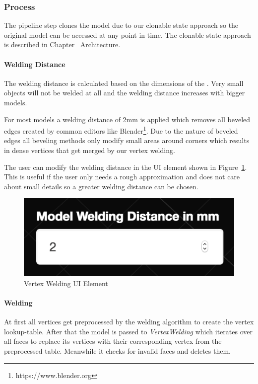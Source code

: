 \documentclass[../ClassicThesis.tex]{subfiles}
\begin{document}
\subsubsection{Process}

The pipeline step clones the model due to our clonable state approach so the original model can be accessed at any point in time. The clonable state approach is described in Chapter~ Architecture.


\paragraph{Welding Distance}

The welding distance is calculated based on the dimensions of the {\threedmodel}. Very small objects will not be welded at all and the welding distance increases with bigger models.

For most models a welding distance of 2mm is applied which removes all beveled edges created by common editors like Blender\footnote{https://www.blender.org}. Due to the nature of beveled edges all beveling methods only modify small areas around corners which results in dense vertices that get merged by our vertex welding.

The user can modify the welding distance in the UI element shown in Figure~\ref{fig:weldingUI}. This is useful if the user only needs a rough approximation and does not care about small details so a greater welding distance can be chosen.

\begin{figure}
\includegraphics[width=0.5\columnwidth]{Images/04-approx-weldingUI.png}
\caption{Vertex Welding UI Element}
\label{fig:weldingUI}
\end{figure}



\paragraph{Welding}

At first all vertices get preprocessed by the welding algorithm to create the vertex lookup-table. After that the model is passed to \emph{VertexWelding} which iterates over all faces to replace its vertices with their corresponding vertex from the preprocessed table. Meanwhile it checks for invalid faces and deletes them.
\end{document}
